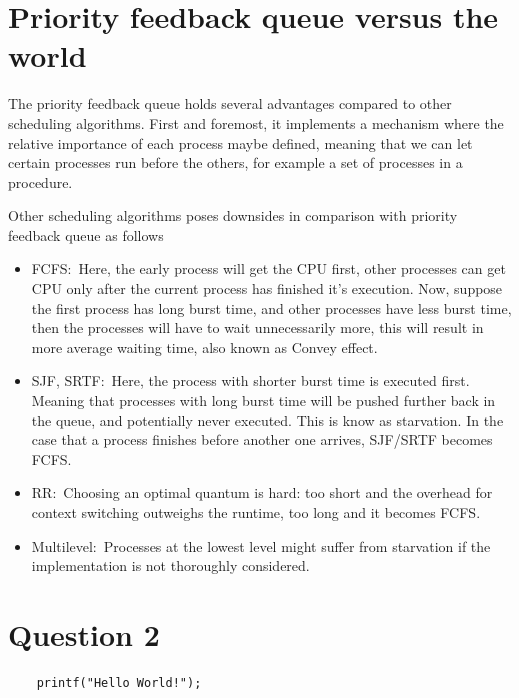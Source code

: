 \documentclass[a4paper]{article}
\numberwithin{equation}{section}
\begin{document}
\newpage
\section{Priority feedback queue versus the world}

The priority feedback queue holds several advantages compared to other scheduling algorithms.
First and foremost, it implements a mechanism where the relative importance of each process maybe defined, meaning that we can let certain processes run before the others, for example a set of processes in a procedure.

Other scheduling algorithms poses downsides in comparison with priority feedback queue as follows

\begin{itemize}
  \item FCFS:\
        Here, the early process will get the CPU first, other processes can get CPU only after the current process has finished it’s execution.
        Now, suppose the first process has long burst time, and other processes have less burst time, then the processes will have to wait unnecessarily more, this will result in more average waiting time, also known as Convey effect.
  \item SJF, SRTF:\
        Here, the process with shorter burst time is executed first. Meaning that processes with long burst time will be pushed further back in the queue, and potentially never executed.
        This is know as starvation.
        In the case that a process finishes before another one arrives, SJF/SRTF becomes FCFS.\
  \item RR:\
        Choosing an optimal quantum is hard: too short and the overhead for context switching outweighs the runtime, too long and it becomes FCFS.\
  \item Multilevel:\
        Processes at the lowest level might suffer from starvation if the implementation is not thoroughly considered.
\end{itemize}

\section{Question 2}

\begin{mdframed}[leftline=false,rightline=false,backgroundcolor=magenta!10,nobreak=true]
  \begin{verbatim}
    printf("Hello World!");
  \end{verbatim}
\end{mdframed}

\newpage
\end{document}
